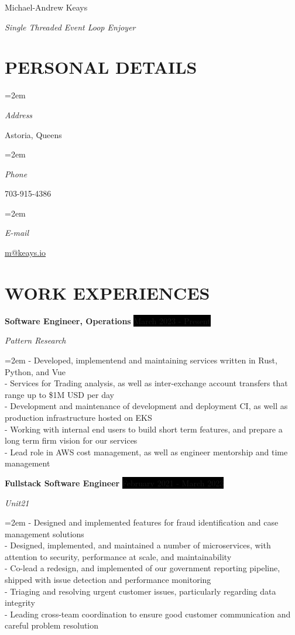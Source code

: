 \documentclass[paper=a4,fontsize=9pt]{scrartcl} %
\newlength{\spacebox}
\newcommand{\sepspace}{\vspace*{0.5em}}		%
\newcommand{\MyName}[1]{ %
		\Huge \usefont{OT1}{phv}{b}{n} \hfill #1
		\par \normalsize \normalfont}
\newcommand{\MySlogan}[1]{ %
		\large \usefont{OT1}{phv}{m}{n}\hfill \textit{#1}
		\par \normalsize \normalfont}
\newcommand{\NewPart}[1]{\section*{\uppercase{#1}}}
\newcommand{\PersonalEntry}[2]{
		\noindent\hangindent=2em\hangafter=0 %
		\parbox{\spacebox}{        %
		\textit{#1}}		       %
		\hspace{1.5em} #2 \par}    %
\newcommand{\EducationEntry}[4]{
		\noindent \textbf{#1} \hfill      %
		\colorbox{Black}{%
			\parbox{6em}{%
			\hfill\color{White}#2}} \par  %
		\noindent \textit{#3} \par        %
		\noindent\hangindent=2em\hangafter=0 \small #4 %
		\normalsize \par}
\newcommand{\WorkEntry}[4]{				  %
		\noindent \textbf{#1} \hfill      %
		\colorbox{Black}{\color{White}#2} \par  %
		\noindent \textit{#3} \par              %
		\noindent\hangindent=2em\hangafter=0 \small #4 %
		\normalsize \par}
\begin{document}

\MyName{Michael-Andrew Keays}
\MySlogan{Single Threaded Event Loop Enjoyer}


\NewPart{Personal details}

\PersonalEntry{Address}{Astoria, Queens}
\PersonalEntry{Phone}{703-915-4386}
\PersonalEntry{E-mail}{\url{m@keays.io}}

\NewPart{Work Experiences}{}

\WorkEntry
    {Software Engineer, Operations}
    {March 2023 - Present}
    {Pattern Research}
    {- Developed, implementend and maintaining services written in Rust, Python, and Vue\\
    - Services for Trading analysis, as well as inter-exchange account transfers that range up to \$1M USD per day\\
    - Development and maintenance of development and deployment CI, as well as production infrastructure hosted on EKS\\
    - Working with internal end users to build short term features, and prepare a long term firm vision for our services\\
    - Lead role in AWS cost management, as well as engineer mentorship and time management}

\sepspace

\WorkEntry
    {Fullstack Software Engineer}
    {February 2021 - March 2023}
    {Unit21}
    {- Designed and implemented features for fraud identification and case management solutions\\
    - Designed, implemented, and maintained a number of microservices, with attention to security, performance at scale, and maintainability\\
    - Co-lead a redesign, and implemented of our government reporting pipeline, shipped with issue detection and performance monitoring\\
    - Triaging and resolving urgent customer issues, particularly regarding data integrity\\
    - Leading cross-team coordination to ensure good customer communication and careful problem resolution}
\end{document}

